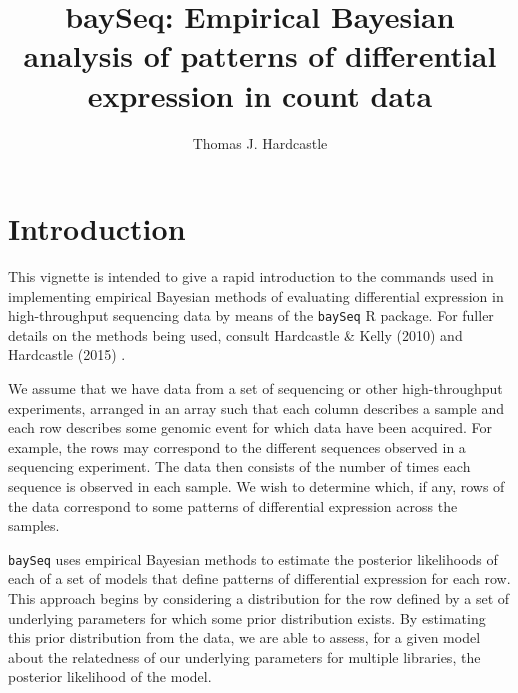 \documentclass[a4paper]{article}
\title{baySeq: Empirical Bayesian analysis of patterns of differential expression in count data}
\author{Thomas J. Hardcastle}
\begin{document}
\maketitle

\section{Introduction}

This vignette is intended to give a rapid introduction to the commands used in implementing empirical Bayesian methods of evaluating differential expression in high-throughput sequencing data by means of the \verb'baySeq' \textsf{R} package. For fuller details on the methods being used, consult Hardcastle \& Kelly (2010) \cite{hardcastle} and Hardcastle (2015) \cite{hardcastle2015}.

We assume that we have data from a set of sequencing or other high-throughput experiments, arranged in an array such that each column describes a sample and each row describes some genomic event for which data have been acquired. For example, the rows may correspond to the different sequences observed in a sequencing experiment. The data then consists of the number of times each sequence is observed in each sample. We wish to determine which, if any, rows of the data correspond to some patterns of differential expression across the samples. 

\verb'baySeq' uses empirical Bayesian methods to estimate the posterior likelihoods of each of a set of models that define patterns of differential expression for each row. This approach begins by considering a distribution for the row defined by a set of underlying parameters for which some prior distribution exists. By estimating this prior distribution from the data, we are able to assess, for a given model about the relatedness of our underlying parameters for multiple libraries, the posterior likelihood of the model.
\end{document}
